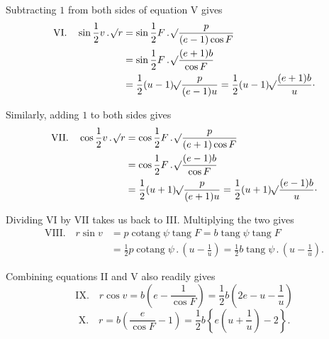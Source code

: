 Subtracting $1$ from both sides of equation V gives
\[
\begin{aligned}
\mathrm{VI.}\quad\sin\frac{1}{2}v\, .\,\mathord{{}^{}\!\surd}r&=\sin\frac{1}{2}F\, .\,\mathord{{}^{}\!\surd}\frac{p}{(e-1)\cos F}\\
&=\sin\frac{1}{2}F\, .\,\mathord{{}^{}\!\surd}\frac{(e+1)b}{\cos F}\\
&=\frac{1}{2}(u-1)\mathord{{}^{}\!\surd}\frac{p}{(e-1)u}=\frac{1}{2}(u-1)\mathord{{}^{}\!\surd}\frac{(e+1)b}{u}\cdot
\end{aligned}
\]

Similarly, adding $1$ to both sides gives
\[
\begin{aligned}
\mathrm{VII.}\quad\cos\frac{1}{2}v\, .\,\mathord{{}^{}\!\surd}r&=\cos\frac{1}{2}F\, .\,\mathord{{}^{}\!\surd}\frac{p}{(e+1)\cos F}\\
&=\cos\frac{1}{2}F\, .\,\mathord{{}^{}\!\surd}\frac{(e-1)b}{\cos F}\\
&=\frac{1}{2}(u+1)\mathord{{}^{}\!\surd}\frac{p}{(e+1)u}=\frac{1}{2}(u+1)\mathord{{}^{}\!\surd}\frac{(e-1)b}{u}\cdot
\end{aligned}
\]

Dividing VI by VII takes us back to III. Multiplying the two gives
\[
\begin{aligned}
\mathrm{VIII.}\quad r\sin v&=p\operatorname{cotang}\psi\operatorname{tang}F=b\operatorname{tang}\psi\operatorname{tang}F\\
&=\frac{1}{2}p\operatorname{cotang}\psi\, .\,\left(u-\frac{1}{u}\right)=\frac{1}{2}b\operatorname{tang}\psi\, .\,\left(u-\frac{1}{u}\right).
\end{aligned}
\]

Combining equations II and V also readily gives
\[
\mathrm{IX.}\quad r\cos v=b\left(e-\frac{1}{\cos F}\right)=\frac{1}{2}b\left(2e-u-\frac{1}{u}\right)
\]
\[
\mathrm{X.}\quad r=b\left(\frac{e}{\cos F}-1\right)=\frac{1}{2}b\left\{e\left(u+\frac{1}{u}\right)-2\right\}.
\]
